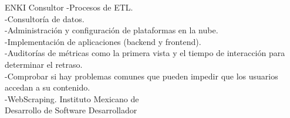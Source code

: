 \documentclass[%
	       doublesided,
	       paper=a4,
	       fontsize=10pt
	      ]{my-resume}
\begin{document}
{{    }
    \vspace{0.5em}
	{ENKI}
	{Consultor}
	{
	    -Procesos de ETL.\\
	    -Consultoría de datos.\\
	    -Administración y configuración de plataformas en la nube.\\ 
	    -Implementación de aplicaciones (backend y frontend).\\ 
	    -Auditorías de métricas como la primera vista y el tiempo de interacción para determinar el retraso.\\ 
	    -Comprobar si hay problemas comunes que pueden impedir que los usuarios accedan a su contenido.\\
	    -WebScraping.
	    }
	{Instituto Mexicano de \\Desarrollo de Software}
	{Desarrollador}
}
\end{document}
